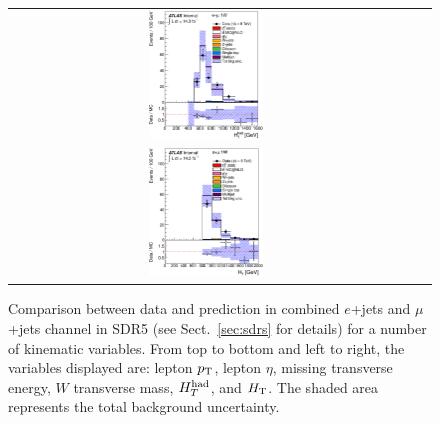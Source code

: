 \begin{figure}[h!]
\begin{center}
\begin{tabular}{ccc}
\includegraphics[width=0.30\textwidth]{appendices/figures/sdrs/HTHad_ELEMUONCR4_1W_NOMINAL.eps}  \\
\includegraphics[width=0.30\textwidth]{appendices/figures/sdrs/HTAll_ELEMUONCR4_1W_NOMINAL.eps}  &  &\\
\end{tabular}\caption{\small {Comparison between data and prediction in combined $e$+jets and $\mu$+jets channel in SDR5 (see Sect.~\ref{sec:sdrs} for details) 
for a number of kinematic variables. From top to bottom and left to right, the variables displayed are: lepton $\pt$, lepton $\eta$, missing transverse energy, $W$ transverse mass,
$\hthad$, and $\HT$. The shaded area represents the total background uncertainty.}}
\label{fig:ELEMUONCR4_1}
\end{center}
\end{figure}                                                                             


